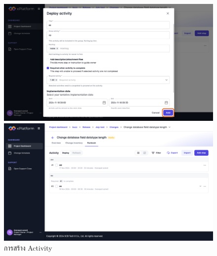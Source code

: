 \begin{figure}[H]
    \begin{center}
        \includegraphics[width=\linewidth]{resources/pages/change-runbook/create-activity/5.png}
    
        \vspace{1in}
    
        \includegraphics[width=\linewidth]{resources/pages/change-runbook/create-activity/6.png}
    \end{center}
    \caption[การสร้าง Activity]{การสร้าง Activity}
  \label{fig:create-activity}
\end{figure}

\newpage
